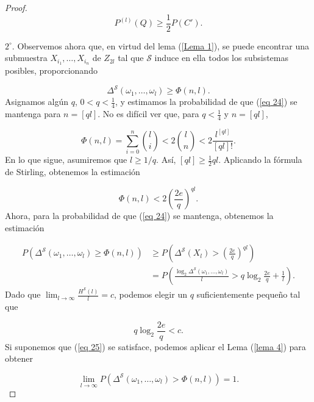 \documentclass{report}
\begin{document}
\begin{proof}
\begin{equation*}
P^{(l)}(Q) \geq \frac{1}{2} P(C').
\end{equation*}

\bigskip
\( 2^\circ \). Observemos ahora que, en virtud del lema (\ref{Lema 1}), se puede encontrar una submuestra \( X_{i_1}, \dots, X_{i_n} \) de \( Z_{2l} \) tal que \( \mathcal{S} \) induce en ella todos los subsistemas posibles, proporcionando

\begin{equation}\label{eq 24}
\Delta^{\mathcal{S}}(\omega_1, \dots, \omega_l) \geq \Phi(n, l).
\end{equation}
Asignamos algún \( q \), \( 0 < q < \frac{1}{4} \), y estimamos la probabilidad de que (\ref{eq 24}) se mantenga para \( n = [ ql ] \). No es difícil ver que, para \( q < \frac{1}{4} \) y \( n = [ ql ] \),

\begin{equation*}
\Phi(n, l) = \sum_{i=0}^{n} \binom{l}{i} < 2 \binom{l}{n} < 2 \frac{l^{[ ql ]}}{[ ql ] !}.
\end{equation*}
En lo que sigue, asumiremos que \( l \geq 1/q \). Así, \( [ ql ] \geq \frac{1}{2} ql \). Aplicando la fórmula de Stirling, obtenemos la estimación

\begin{equation*}
\Phi(n, l) < 2 \left( \frac{2e}{q} \right)^{ql}.
\end{equation*}
Ahora, para la probabilidad de que (\ref{eq 24}) se mantenga, obtenemos la estimación

\begin{align*}
P \left( \Delta^{\mathcal{S}}(\omega_1, \dots, \omega_l) \geq \Phi(n, l) \right) 
&\geq P \left( \Delta^{\mathcal{S}}(X_l) > \left( \frac{2e}{q} \right)^{ql} \right) \\
&= P \left( \frac{\log_2 \Delta^{\mathcal{S}}(\omega_1, \dots, \omega_l)}{l} > q \log_2 \frac{2e}{q} + \frac{1}{l} \right).
\end{align*}
Dado que \( \lim_{l \to \infty} \frac{H^{\mathcal{S}}(l)}{l} = c \), podemos elegir un \( q \) suficientemente pequeño tal que

\begin{equation}\label{eq 25}
q \log_2 \frac{2e}{q} < c.
\end{equation}
Si suponemos que (\ref{eq 25}) se satisface, podemos aplicar el Lema (\ref{lema 4}) para obtener

\begin{equation}\label{eq 26}
\lim_{l \to \infty} P \left( \Delta^{\mathcal{S}}(\omega_1, \dots, \omega_l) > \Phi(n, l) \right) = 1.
\end{equation}


\end{proof}
\end{document}

